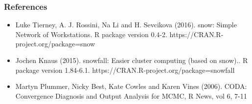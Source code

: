 \documentclass{beamer}
\begin{document}
\begin{frame}
  \frametitle{References}
    \begin{itemize}
      \item Luke Tierney, A. J. Rossini, Na Li and H. Sevcikova (2016). snow: Simple Network of Workstations. R package version 0.4-2. https://CRAN.R-project.org/package=snow
      \item Jochen Knaus (2015). snowfall: Easier cluster computing (based on snow).. R package version 1.84-6.1. https://CRAN.R-project.org/package=snowfall
      \item Martyn Plummer, Nicky Best, Kate Cowles and Karen Vines (2006). CODA: Convergence Diagnosis and Output Analysis for MCMC, R News, vol 6, 7-11
    \end{itemize}
\end{frame}
\end{document}
